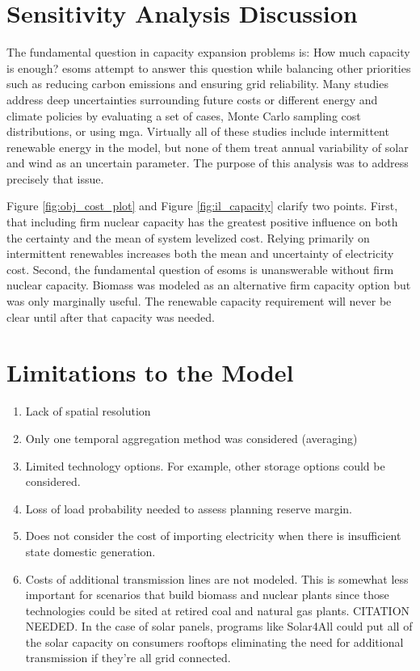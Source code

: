 \section{Sensitivity Analysis Discussion}

The fundamental question in capacity expansion problems is: How much capacity is enough?
\glspl{esom} attempt to answer this question while balancing other priorities such
as reducing carbon emissions and ensuring grid reliability. Many studies address
deep uncertainties surrounding future costs
\cite{alzbutas_uncertainty_2012,barron_differential_2015,komiyama_energy_2015,
li_open_2020,yue_least_2020} or different energy and climate policies \cite{bennett_extending_2021,
bouckaert_expanding_2014,de_sisternes_value_2016,decarolis_modelling_2016,neumann_near-optimal_2021,
seck_embedding_2020} by evaluating a set of cases, Monte Carlo sampling cost distributions,
or using \gls{mga}. Virtually all of these studies include intermittent renewable
energy in the model, but none of them treat annual variability of solar and wind
as an uncertain parameter. The purpose of this analysis was to address precisely
that issue.

Figure \ref{fig:obj_cost_plot} and Figure \ref{fig:il_capacity} clarify
two points. First, that including firm nuclear capacity has the greatest positive
influence on both the certainty and the mean of system levelized cost. Relying primarily
on intermittent renewables increases both the mean and uncertainty of electricity cost.
Second, the fundamental question of \glspl{esom} is unanswerable without firm nuclear capacity.
Biomass was modeled as an alternative firm capacity option but was only marginally
useful. The renewable capacity requirement will never be clear until after that capacity
was needed.

\section{Limitations to the Model}
\begin{enumerate}
  \item Lack of spatial resolution
  \item Only one temporal aggregation method was considered (averaging)
  \item Limited technology options. For example, other storage options
  could be considered.
  \item Loss of load probability needed to assess planning reserve margin.
  \item Does not consider the cost of importing electricity when there is insufficient
  state domestic generation.
  \item Costs of additional transmission lines are not modeled. This is somewhat less important
  for scenarios that build biomass and nuclear plants since those technologies could
  be sited at retired coal and natural gas plants. CITATION NEEDED. In the case of
  solar panels, programs like Solar4All could put all of the solar capacity on
  consumers rooftops eliminating the need for additional transmission if they're all
  grid connected.
\end{enumerate}
